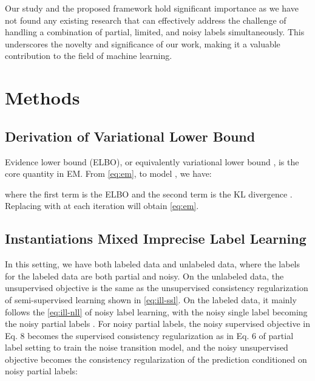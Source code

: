 Our study and the proposed framework hold significant importance as we have not found any existing research that can effectively address the challenge of handling a combination of partial, limited, and noisy labels simultaneously. This underscores the novelty and significance of our work, making it a valuable contribution to the field of machine learning.

















\section{Methods}


\subsection{Derivation of Variational Lower Bound}
\label{sec:append-var-lower-bound}

Evidence lower bound (ELBO), or equivalently variational lower bound \citep{dempster1977maximum}, is the core quantity in EM. 
From \cref{eq:em}, to model , we have:

where the first term is the ELBO and the second term is the KL divergence . Replacing  with  at each iteration will obtain \cref{eq:em}.


\subsection{Instantiations Mixed Imprecise Label Learning}
\label{sec:append-derive-instan}


In this setting, we have both labeled data and unlabeled data, where the labels for the labeled data are both partial and noisy. 
On the unlabeled data, the unsupervised objective is the same as the unsupervised consistency regularization of semi-supervised learning shown in \cref{eq:ill-ssl}. 
On the labeled data, it mainly follows the \cref{eq:ill-nll} of noisy label learning, with the noisy single label becoming the noisy partial labels . 
For noisy partial labels, the noisy supervised objective in Eq. 8 becomes the supervised consistency regularization as in Eq. 6 of partial label setting to train the noise transition model, and the noisy unsupervised objective becomes the consistency regularization of the prediction conditioned on noisy partial labels:


